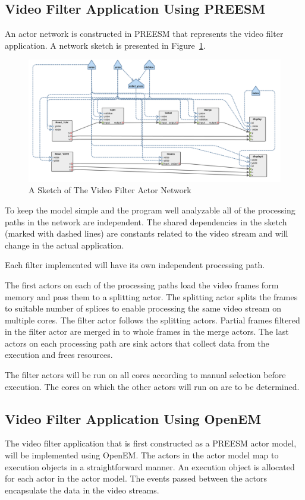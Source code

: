 \subsection{Video Filter Application Using PREESM}
An actor network is constructed in PREESM that represents the video filter application. A network sketch is presented in Figure~\ref{sketch}.
\begin{figure}[h!]
\begin{center}
\includegraphics[width=1.3\textwidth,natwidth=2250,natheight=1090]{preesm_gauss.png}
\caption{A Sketch of The Video Filter Actor Network}\label{sketch}
\end{center}
\end{figure}
To keep the model simple and the program well analyzable all of the processing paths in the network are independent. The shared dependencies in the sketch (marked with dashed lines) are constants related to the video stream and will change in the actual application.

Each filter implemented will have its own independent processing path.

The first actors on each of the processing paths load the video frames form memory and pass them to a splitting actor. The splitting actor splits the frames to suitable number of splices to enable processing the same video stream on multiple cores. The filter actor follows the splitting actors. Partial frames filtered in the filter actor are merged in to whole frames in the merge actors. The last actors on each processing path are sink actors that collect data from the execution and frees resources.

The filter actors will be run on all cores according to manual selection before execution. The cores on which the other actors will run on are to be determined.

\subsection{Video Filter Application Using OpenEM}
The video filter application that is first constructed as a PREESM actor model, will be implemented using OpenEM. The actors in the actor model map to execution objects in a straightforward manner. An execution object is allocated for each actor in the actor model. The events passed between the actors encapsulate the data in the video streams.

